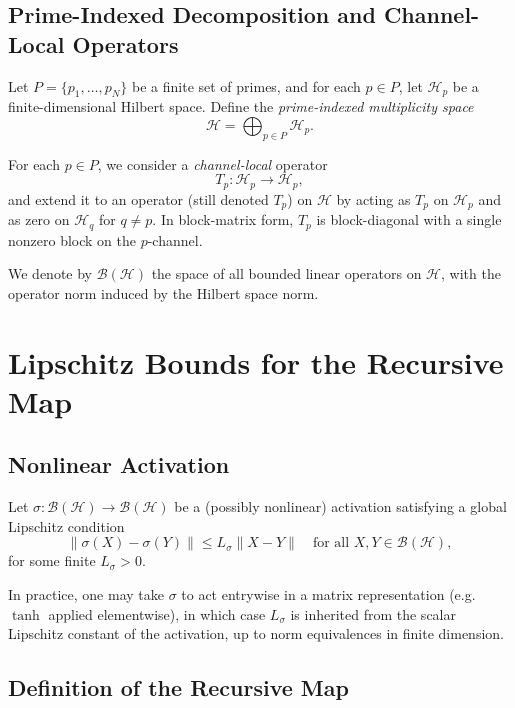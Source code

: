 \documentclass[12pt]{article}
\begin{document}
\subsection{Prime-Indexed Decomposition and Channel-Local Operators}

Let \(P = \{p_1,\dots,p_N\}\) be a finite set of primes, and for each \(p\in P\), let \(\mathcal{H}_p\) be a finite-dimensional Hilbert space. Define the \emph{prime-indexed multiplicity space}
\[
  \mathcal{H} = \bigoplus_{p\in P} \mathcal{H}_p.
\]

For each \(p\in P\), we consider a \emph{channel-local} operator
\[
  T_p : \mathcal{H}_p \to \mathcal{H}_p,
\]
and extend it to an operator (still denoted \(T_p\)) on \(\mathcal{H}\) by acting as \(T_p\) on \(\mathcal{H}_p\) and as zero on \(\mathcal{H}_q\) for \(q\neq p\). In block-matrix form, \(T_p\) is block-diagonal with a single nonzero block on the \(p\)-channel.

We denote by \(\mathcal{B}(\mathcal{H})\) the space of all bounded linear operators on \(\mathcal{H}\), with the operator norm induced by the Hilbert space norm.

\section{Lipschitz Bounds for the Recursive Map}
\label{sec:appendix-lipschitz}

\subsection{Nonlinear Activation}

Let \(\sigma:\mathcal{B}(\mathcal{H})\to\mathcal{B}(\mathcal{H})\) be a (possibly nonlinear) activation satisfying a global Lipschitz condition
\begin{equation}
  \|\sigma(X) - \sigma(Y)\|
  \le
  L_\sigma \|X - Y\|
  \quad \text{for all } X,Y\in\mathcal{B}(\mathcal{H}),
  \label{eq:sigma-Lipschitz}
\end{equation}
for some finite \(L_\sigma > 0\).

In practice, one may take \(\sigma\) to act entrywise in a matrix representation (e.g.\ \(\tanh\) applied elementwise), in which case \(L_\sigma\) is inherited from the scalar Lipschitz constant of the activation, up to norm equivalences in finite dimension.

\subsection{Definition of the Recursive Map}
\end{document}
